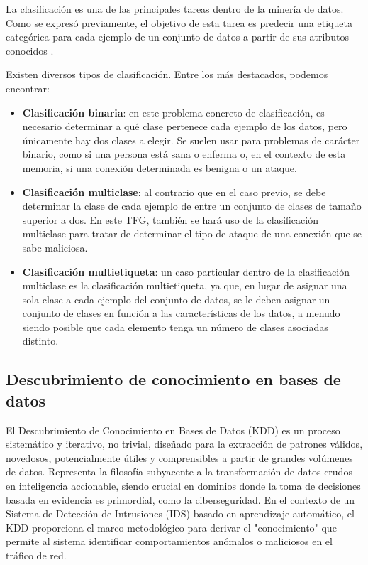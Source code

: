 La clasificación es una de las principales tareas dentro de la minería de datos.
Como se expresó previamente, el objetivo de esta tarea es predecir una etiqueta categórica para cada ejemplo de un conjunto de datos a partir de sus atributos conocidos \cite{hastie2009elements}.

Existen diversos tipos de clasificación. Entre los más destacados, podemos encontrar:

\begin{itemize}
    \item\textbf{Clasificación binaria}: en este problema concreto de clasificación, es necesario determinar a qué clase pertenece cada ejemplo de los datos, pero únicamente hay dos clases a elegir. Se suelen usar para problemas de carácter binario, como si una persona está sana o enferma o, en el contexto de esta memoria, si una conexión determinada es benigna o un ataque.
    
    \item\textbf{Clasificación multiclase}: al contrario que en el caso previo, se debe determinar la clase de cada ejemplo de entre un conjunto de clases de tamaño superior a dos. En este TFG, también se hará uso de la clasificación multiclase para tratar de determinar el tipo de ataque de una conexión que se sabe maliciosa.
    
    \item\textbf{Clasificación multietiqueta}: un caso particular dentro de la clasificación multiclase es la clasificación multietiqueta, ya que, en lugar de asignar una sola clase a cada ejemplo del conjunto de datos, se le deben asignar un conjunto de clases en función a las características de los datos, a menudo siendo posible que cada elemento tenga un número de clases asociadas distinto.

\end{itemize}

\subsection{Descubrimiento de conocimiento en bases de datos}

El Descubrimiento de Conocimiento en Bases de Datos (KDD) es un proceso sistemático y iterativo, no trivial, diseñado para la extracción de patrones válidos, novedosos, potencialmente útiles y comprensibles a partir de grandes volúmenes de datos. Representa la filosofía subyacente a la transformación de datos crudos en inteligencia accionable, siendo crucial en dominios donde la toma de decisiones basada en evidencia es primordial, como la ciberseguridad. En el contexto de un Sistema de Detección de Intrusiones (IDS) basado en aprendizaje automático, el KDD proporciona el marco metodológico para derivar el "conocimiento" que permite al sistema identificar comportamientos anómalos o maliciosos en el tráfico de red.

